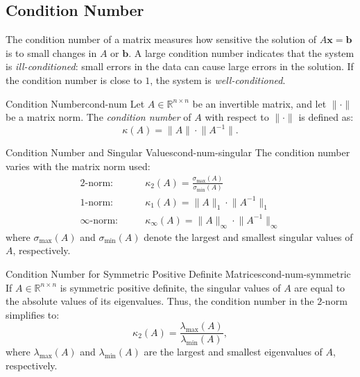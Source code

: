 \subsection{Condition Number}

The condition number of a matrix measures how sensitive the solution of \(A\mathbf{x} = \mathbf{b}\) is to small changes in \(A\) or \(\mathbf{b}\). A large condition number indicates that the system is \emph{ill-conditioned}: small errors in the data can cause large errors in the solution. If the condition number is close to \(1\), the system is \emph{well-conditioned}.
\begin{definition}{Condition Number}{cond-num}
    Let \(A \in \mathbb{R}^{n \times n}\) be an invertible matrix, and let \(\lVert \cdot \rVert\) be a matrix norm. The \emph{condition number} of \(A\) with respect to \(\lVert \cdot \rVert\) is defined as:
    \[
        \kappa(A) = \lVert A \rVert \cdot \lVert A^{-1} \rVert.
    \]
\end{definition}

\begin{property}{Condition Number and Singular Values}{cond-num-singular}
    The condition number varies with the matrix norm used:
    \begin{align*}
        \text{\(2\)-norm:} \qquad & \kappa_2(A) = \frac{\sigma_{\max}(A)}{\sigma_{\min}(A)} \\
        \text{\(1\)-norm:} \qquad & \kappa_1(A) = \lVert A \rVert_1 \cdot \lVert A^{-1} \rVert_1 \\
        \text{\(\infty\)-norm:} \qquad & \kappa_\infty(A) = \lVert A \rVert_\infty \cdot \lVert A^{-1} \rVert_\infty
    \end{align*}
    where \(\sigma_{\max}(A)\) and \(\sigma_{\min}(A)\) denote the largest and smallest singular values of \(A\), respectively.
\end{property}

\begin{remark}{Condition Number for Symmetric Positive Definite Matrices}{cond-num-symmetric}
    If \(A \in \mathbb{R}^{n \times n}\) is symmetric positive definite, the singular values of \(A\) are equal to the absolute values of its eigenvalues. Thus, the condition number in the \(2\)-norm simplifies to:
    \[
        \kappa_2(A) = \frac{\lambda_{\max}(A)}{\lambda_{\min}(A)},
    \]
    where \(\lambda_{\max}(A)\) and \(\lambda_{\min}(A)\) are the largest and smallest eigenvalues of \(A\), respectively.
\end{remark}

